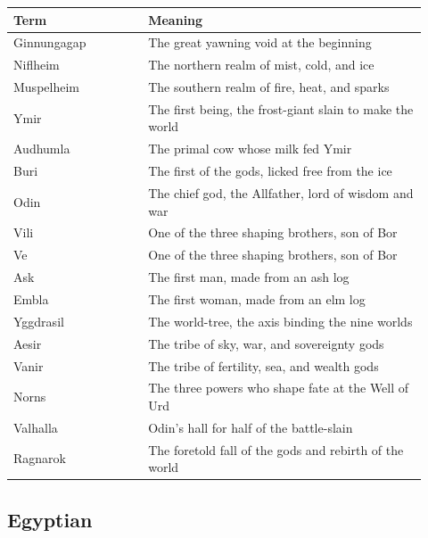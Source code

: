 \begin{longtable}{L{0.30\linewidth} L{0.62\linewidth}}
\toprule
\textbf{Term} & \textbf{Meaning} \\
\midrule
\endhead
Ginnungagap & The great yawning void at the beginning \\
Niflheim & The northern realm of mist, cold, and ice \\
Muspelheim & The southern realm of fire, heat, and sparks \\
Ymir & The first being, the frost-giant slain to make the world \\
Audhumla & The primal cow whose milk fed Ymir \\
Buri & The first of the gods, licked free from the ice \\
Odin & The chief god, the Allfather, lord of wisdom and war \\
Vili & One of the three shaping brothers, son of Bor \\
Ve & One of the three shaping brothers, son of Bor \\
Ask & The first man, made from an ash log \\
Embla & The first woman, made from an elm log \\
Yggdrasil & The world-tree, the axis binding the nine worlds \\
Aesir & The tribe of sky, war, and sovereignty gods \\
Vanir & The tribe of fertility, sea, and wealth gods \\
Norns & The three powers who shape fate at the Well of Urd \\
Valhalla & Odin's hall for half of the battle-slain \\
Ragnarok & The foretold fall of the gods and rebirth of the world \\
\bottomrule
\end{longtable}

\subsection{Egyptian}

